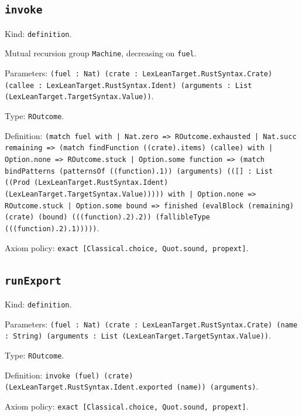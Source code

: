 \documentclass[11pt]{article}
\begin{document}
\subsection*{\texttt{invoke}}
\noindent Kind: \texttt{definition}.\par
\noindent Mutual recursion group \texttt{Machine}, decreasing on \texttt{fuel}.\par
\noindent Parameters: \texttt{(fuel : Nat) (crate : LexLeanTarget.RustSyntax.Crate) (callee : LexLeanTarget.RustSyntax.Ident) (arguments : List (LexLeanTarget.TargetSyntax.Value))}.\par
\noindent Type: \texttt{ROutcome}.\par
\noindent Definition: \texttt{(match fuel with | Nat.zero => ROutcome.exhausted | Nat.succ remaining => (match findFunction ((crate).items) (callee) with | Option.none => ROutcome.stuck | Option.some function => (match bindPatterns (patternsOf ((function).1)) (arguments) (([] : List ((Prod (LexLeanTarget.RustSyntax.Ident) (LexLeanTarget.TargetSyntax.Value))))) with | Option.none => ROutcome.stuck | Option.some bound => finished (evalBlock (remaining) (crate) (bound) (((function).2).2)) (fallibleType (((function).2).1)))))}.\par
\noindent Axiom policy: \texttt{exact [Classical.choice, Quot.sound, propext]}.\par
\subsection*{\texttt{runExport}}
\noindent Kind: \texttt{definition}.\par
\noindent Parameters: \texttt{(fuel : Nat) (crate : LexLeanTarget.RustSyntax.Crate) (name : String) (arguments : List (LexLeanTarget.TargetSyntax.Value))}.\par
\noindent Type: \texttt{ROutcome}.\par
\noindent Definition: \texttt{invoke (fuel) (crate) (LexLeanTarget.RustSyntax.Ident.exported (name)) (arguments)}.\par
\noindent Axiom policy: \texttt{exact [Classical.choice, Quot.sound, propext]}.\par
\end{document}

